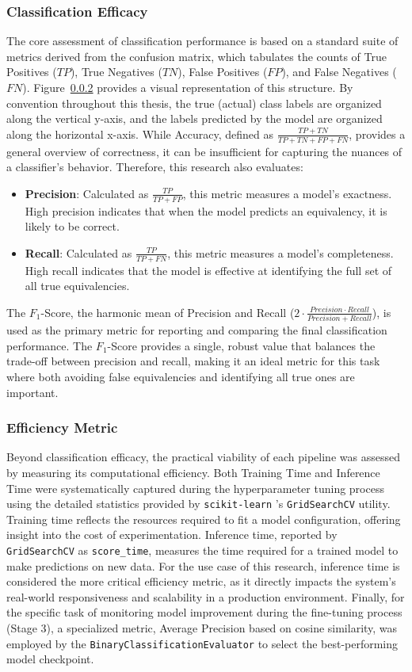 \subsubsection{Classification Efficacy}
The core assessment of classification performance is based on a standard suite of metrics derived from the confusion matrix, which tabulates the counts of True Positives (\(TP\)), True Negatives (\(TN\)), False Positives (\(FP\)), and False Negatives (\(FN\)). Figure~\ref{} provides a visual representation of this structure. By convention throughout this thesis, the true (actual) class labels are organized along the vertical y-axis, and the labels predicted by the model are organized along the horizontal x-axis.  While Accuracy, defined as \(\frac{TP + TN}{TP + TN + FP + FN}\), provides a general overview of correctness, it can be insufficient for capturing the nuances of a classifier's behavior. Therefore, this research also evaluates:
\begin{itemize}
    \item \textbf{Precision}: Calculated as \(\frac{TP}{TP + FP}\), this metric measures a model's exactness. High precision indicates that when the model predicts an equivalency, it is likely to be correct.
    \item \textbf{Recall}: Calculated as \(\frac{TP}{TP + FN}\), this metric measures a model's completeness. High recall indicates that the model is effective at identifying the full set of all true equivalencies.
\end{itemize}
The \(F_1\)-Score, the harmonic mean of Precision and Recall (\(2\cdot\frac{Precision\cdot Recall}{Precision + Recall}\)), is used as the primary metric for reporting and comparing the final classification performance. The \(F_1\)-Score provides a single, robust value that balances the trade-off between precision and recall, making it an ideal metric for this task where both avoiding false equivalencies and identifying all true ones are important.

\subsubsection{Efficiency Metric}
Beyond classification efficacy, the practical viability of each pipeline was assessed by measuring its computational efficiency. Both Training Time and Inference Time were systematically captured during the hyperparameter tuning process using the detailed statistics provided by \verb|scikit-learn| \!\!'s \verb|GridSearchCV| utility. Training time reflects the resources required to fit a model configuration, offering insight into the cost of experimentation. Inference time, reported by \verb|GridSearchCV| as \verb|score_time|, measures the time required for a trained model to make predictions on new data. For the use case of this research, inference time is considered the more critical efficiency metric, as it directly impacts the system's real-world responsiveness and scalability in a production environment. Finally, for the specific task of monitoring model improvement during the fine-tuning process (Stage 3), a specialized metric, Average Precision based on cosine similarity, was employed by the \verb|BinaryClassificationEvaluator| to select the best-performing model checkpoint.


